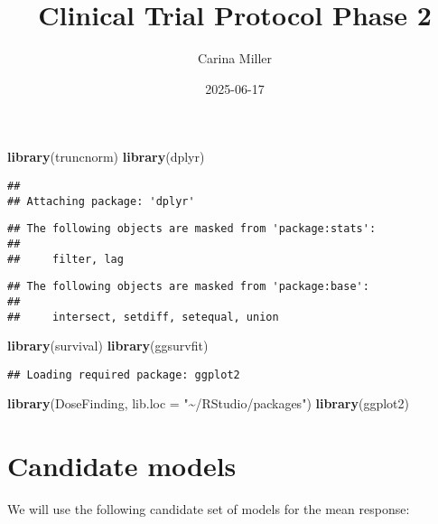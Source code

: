 \documentclass[
]{article}
\title{Clinical Trial Protocol Phase 2}
\author{Carina Miller}
\date{2025-06-17}
\newenvironment{Shaded}{\begin{snugshade}}{\end{snugshade}}
\newcommand{\AttributeTok}[1]{\textcolor[rgb]{0.13,0.29,0.53}{#1}}
\newcommand{\FunctionTok}[1]{\textcolor[rgb]{0.13,0.29,0.53}{\textbf{#1}}}
\newcommand{\NormalTok}[1]{#1}
\newcommand{\StringTok}[1]{\textcolor[rgb]{0.31,0.60,0.02}{#1}}
\begin{document}
\maketitle

\begin{Shaded}
\begin{Highlighting}[]
\FunctionTok{library}\NormalTok{(truncnorm)}
\FunctionTok{library}\NormalTok{(dplyr)}
\end{Highlighting}
\end{Shaded}

\begin{verbatim}
## 
## Attaching package: 'dplyr'
\end{verbatim}

\begin{verbatim}
## The following objects are masked from 'package:stats':
## 
##     filter, lag
\end{verbatim}

\begin{verbatim}
## The following objects are masked from 'package:base':
## 
##     intersect, setdiff, setequal, union
\end{verbatim}

\begin{Shaded}
\begin{Highlighting}[]
\FunctionTok{library}\NormalTok{(survival)}
\FunctionTok{library}\NormalTok{(ggsurvfit)}
\end{Highlighting}
\end{Shaded}

\begin{verbatim}
## Loading required package: ggplot2
\end{verbatim}

\begin{Shaded}
\begin{Highlighting}[]
\FunctionTok{library}\NormalTok{(DoseFinding, }\AttributeTok{lib.loc =} \StringTok{"\textasciitilde{}/RStudio/packages"}\NormalTok{)}
\FunctionTok{library}\NormalTok{(ggplot2)}
\end{Highlighting}
\end{Shaded}

\hypertarget{candidate-models}{%
\section{Candidate models}\label{candidate-models}}

We will use the following candidate set of models for the mean response:
\end{document}
